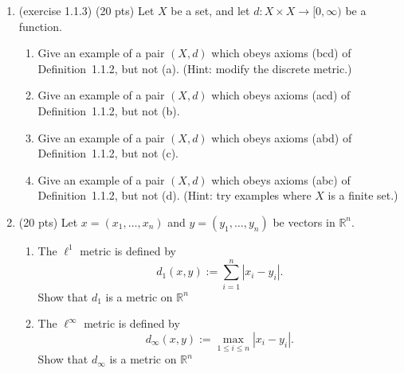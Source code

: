 \documentclass[12pt]{amsart}
\theoremstyle{definition}
\theoremstyle{remark}
\begin{document}
\begin{CJK}{UTF8}{bkai}
\begin{enumerate}
\begin{enumerate}
\end{enumerate}
\vfill
\bigskip

\item[(3)] (exercise 1.1.3)  (20 pts) 
Let $X$ be a set, and let $d : X \times X \to [0,\infty)$ be a function. 

\begin{enumerate}
\item[(a)] Give an example of a pair $(X,d)$ which obeys axioms (bcd) of Definition~1.1.2, but not (a). 
\hfill (Hint: modify the discrete metric.)
\item[(b)] Give an example of a pair $(X,d)$ which obeys axioms (acd) of Definition~1.1.2, but not (b).
\item[(c)] Give an example of a pair $(X,d)$ which obeys axioms (abd) of Definition~1.1.2, but not (c).
\item[(d)] Give an example of a pair $(X,d)$ which obeys axioms (abc) of Definition~1.1.2, but not (d). 
\hfill (Hint: try examples where $X$ is a finite set.)
\end{enumerate}

\vfill
\bigskip

\item[(4)]  (20 pts)  Let $x=(x_1,\dots,x_n)$ and $y=(y_1,\dots,y_n)$ be vectors in $\mathbb{R}^n$.

\vfill
\bigskip

\begin{enumerate}
\item[(a)] The $\ell^1$ metric is defined by
\[
d_1(x,y) := \sum_{i=1}^n |x_i - y_i|.
\]
Show that $d_1$ is a metric on $\mathbb{R}^n$


\item[(b)] The $\ell^\infty$ metric is defined by
\[
d_\infty(x,y) := \max_{1 \leq i \leq n} |x_i - y_i|.
\]
Show that $d_{\infty}$ is a metric on $\mathbb{R}^n$

\end{enumerate}



\end{enumerate}
\end{CJK}
\end{document}
